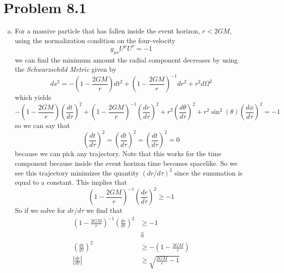 \documentclass[11pt]{article}
\numberwithin{equation}{section}
\newcommand{\HWnum}{8}
\begin{document}


\section{Problem \HWnum.1}
\begin{enumerate}[(a)]
\item
For a massive particle that has fallen inside the event horizon, $r<2GM$, using the normalization condition on the four-velocity 
$$g_{\mu\nu}U^{\mu}U^{\nu} = -1$$
we can find the minimum amount the radial component decreases by using the \emph{Schwarzschild Metric} given by
$$ds^2 = -\left(1-\frac{2GM}{r}\right)dt^2 + \left(1-\frac{2GM}{r}\right)^{-1}dr^2 + r^2d\Omega^2$$
which yields
$$ -\left(1-\frac{2GM}{r}\right)\left(\frac{dt}{d\tau}\right)^2 + \left(1-\frac{2GM}{r}\right)^{-1}\left(\frac{dr}{d\tau}\right)^2 + r^2\left(\frac{d\theta}{d\tau}\right)^2 + r^2\sin^2(\theta)\left(\frac{d\phi}{d\tau}\right)^2 = -1$$
so we can say that
$$\left(\frac{dt}{d\tau}\right)^2 = \left(\frac{dt}{d\tau}\right)^2 = \left(\frac{dt}{d\tau}\right)^2 = 0$$
because we can pick any trajectory. Note that this works for the time component because inside the event horizon time becomes spacelike. So we see this trajectory minimizes the quantity $(dr/d\tau)^2$ since the summation is equal to a constant. This implies that
$$\left(1-\frac{2GM}{r}\right)^{-1}\left(\frac{dr}{d\tau}\right)^2 \ge -1$$
So if we solve for $dr/d\tau$ we find that
\begin{align*}
\left(1-\frac{2GM}{r}\right)^{-1}\left(\frac{dr}{d\tau}\right)^2 &\ge -1\\
&\Downarrow\\
\left(\frac{dr}{d\tau}\right)^2 &\ge -\left(1-\frac{2GM}{r}\right)\\
\left|\frac{dr}{d\tau}\right| &\ge \sqrt{\frac{2GM}{r}-1}
\end{align*}


\end{enumerate}
\end{document}
